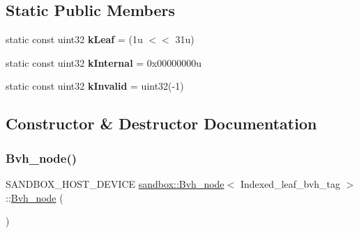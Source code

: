 \subsection*{Static Public Members}
\begin{DoxyCompactItemize}
\item 
\mbox{\label{structsandbox_1_1_bvh__node_3_01_indexed__leaf__bvh__tag_01_4_a7c504322bc1f1056a0f64377d2f6b5fb}} 
static const uint32 {\bfseries k\+Leaf} = (1u $<$$<$ 31u)
\item 
\mbox{\label{structsandbox_1_1_bvh__node_3_01_indexed__leaf__bvh__tag_01_4_a2d619ed362c607fb3a114005b48b7018}} 
static const uint32 {\bfseries k\+Internal} = 0x00000000u
\item 
\mbox{\label{structsandbox_1_1_bvh__node_3_01_indexed__leaf__bvh__tag_01_4_aafa5ea630bdc1dd4f1d5bfa5eb14f5e6}} 
static const uint32 {\bfseries k\+Invalid} = uint32(-\/1)
\end{DoxyCompactItemize}


\subsection{Constructor \& Destructor Documentation}
\mbox{\label{structsandbox_1_1_bvh__node_3_01_indexed__leaf__bvh__tag_01_4_ad1bd8852582c16847eb047d9671d85df}} 
\subsubsection{\texorpdfstring{Bvh\+\_\+node()}{Bvh\_node()}\hspace{0.1cm}{\footnotesize\ttfamily [1/2]}}
{\footnotesize\ttfamily S\+A\+N\+D\+B\+O\+X\+\_\+\+H\+O\+S\+T\+\_\+\+D\+E\+V\+I\+CE \hyperlink{structsandbox_1_1_bvh__node}{sandbox\+::\+Bvh\+\_\+node}$<$ Indexed\+\_\+leaf\+\_\+bvh\+\_\+tag $>$\+::\hyperlink{structsandbox_1_1_bvh__node}{Bvh\+\_\+node} (\begin{DoxyParamCaption}{ }\end{DoxyParamCaption})\hspace{0.3cm}{\ttfamily [inline]}}

